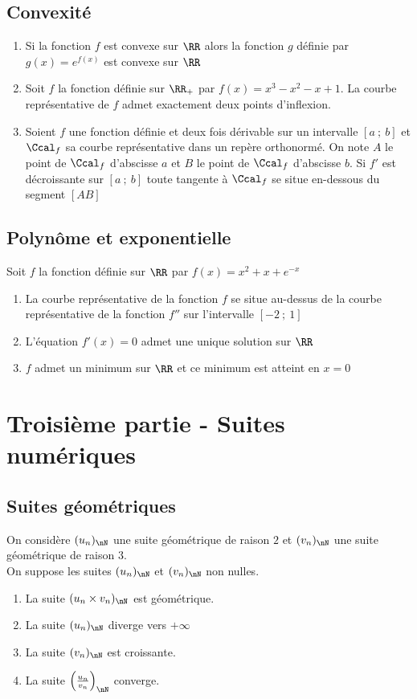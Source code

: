 \documentclass[oneside,12pt]{article}
\begin{document}
\subsection{Convexité}
\begin{enumerate}
	\item Si la fonction $f$ est convexe sur $\RR$ alors la fonction $g$ définie par $g(x)=e^{f(x)}$ est convexe sur $\RR$
	\item Soit $f$ la fonction définie sur $\RR_+$ par $f(x) = x^3-x^2-x+1$. La courbe représentative de $f$ admet exactement deux points d'inflexion.
	\item Soient $f$ une fonction définie et deux fois dérivable sur un intervalle $[a~;~b]$ et $\Ccal_f$ sa courbe représentative dans un repère orthonormé. On note $A$ le point de $\Ccal_f$ d'abscisse $a$ et $B$ le point de $\Ccal_f$ d'abscisse $b$. Si $f'$ est décroissante sur $[a~;~b]$ toute tangente à $\Ccal_f$ se situe en-dessous du segment $[AB]$
\end{enumerate}



\subsection{Polynôme et exponentielle}
Soit $f$ la fonction définie sur $\RR$ par $f(x)=x^2+x+e^{-x}$
\begin{enumerate}
	\item La courbe représentative de la fonction $f$ se situe au-dessus de la courbe représentative de la fonction $f''$ sur l'intervalle $[-2~;~1]$
	\item L'équation $f'(x)=0$ admet une unique solution sur $\RR$
	\item $f$ admet un minimum sur $\RR$ et ce minimum est atteint en $x=0$
\end{enumerate}



\section*{Troisième partie - Suites numériques}

\subsection{Suites géométriques}
On considère $(u_n)_{\nN}$ une suite géométrique de raison $2$ et $(v_n)_{\nN}$ une suite géométrique de raison $3$.\\
On suppose les suites $(u_n)_{\nN}$ et $(v_n)_{\nN}$ non nulles.
\begin{enumerate}
	\item La suite $(u_n\times v_n)_{\nN}$ est géométrique.
	\item La suite $(u_n)_{\nN}$ diverge vers $+\infty$
	\item La suite $(v_n)_{\nN}$ est croissante.
	\item La suite $\left(\frac{u_n}{v_n}\right)_{\nN}$ converge.
\end{enumerate}
\end{document}
